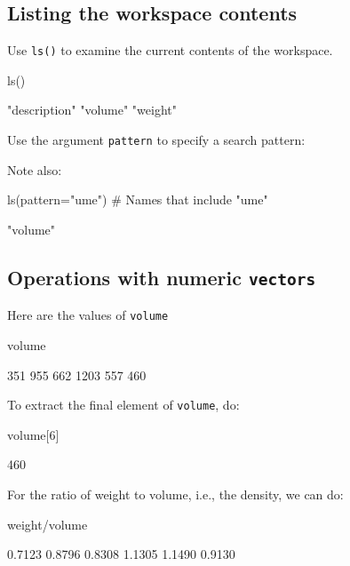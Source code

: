 \documentclass{tufte-book}\usepackage[]{graphicx}\usepackage[]{color}
\newcommand{\txtt}[1]{\texttt{#1}}
\begin{document}
\subsection*{Listing the workspace contents}

Use \txtt{ls()} to examine the current contents
of the workspace.
\begin{Schunk}
\begin{Sinput}
ls()
\end{Sinput}
\begin{Soutput}
[1] "description" "volume"      "weight"     
\end{Soutput}
\end{Schunk}
Use the argument \txtt{pattern} to specify a search pattern:
\begin{marginfigure}[40pt]
Note also:\\[-5pt]
\begin{Schunk}
\end{Schunk}
\end{marginfigure}
\begin{Schunk}
\begin{Sinput}
ls(pattern="ume")   # Names that include "ume"
\end{Sinput}
\begin{Soutput}
[1] "volume"
\end{Soutput}
\end{Schunk}

\subsection*{Operations with numeric \txtt{vectors}}
Here are the values of \txtt{volume}
\begin{Schunk}
\begin{Sinput}
volume
\end{Sinput}
\begin{Soutput}
[1]  351  955  662 1203  557  460
\end{Soutput}
\end{Schunk}

To extract the final element of \txtt{volume}, do:
\begin{Schunk}
\begin{Sinput}
volume[6]
\end{Sinput}
\begin{Soutput}
[1] 460
\end{Soutput}
\end{Schunk}
For the ratio of weight to volume, i.e., the density, we can do:
\begin{Schunk}
\begin{Sinput}
weight/volume
\end{Sinput}
\begin{Soutput}
[1] 0.7123 0.8796 0.8308 1.1305 1.1490 0.9130
\end{Soutput}
\end{Schunk}
\end{document}
